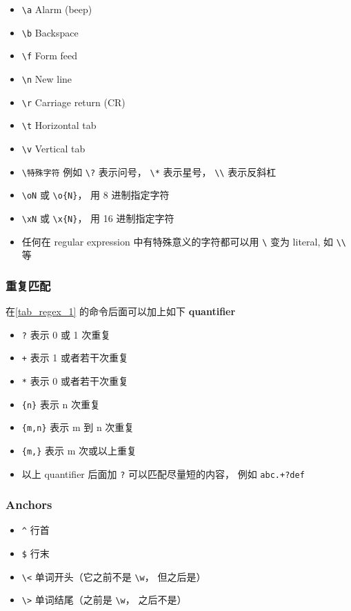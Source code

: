 \begin{itemize}
\item \verb`\a` Alarm (beep)
\item \verb`\b` Backspace
\item \verb`\f` Form feed
\item \verb`\n` New line
\item \verb`\r` Carriage return (CR)
\item \verb`\t` Horizontal tab
\item \verb`\v` Vertical tab
\item \verb`\特殊字符` 例如 \verb`\?` 表示问号， \verb`\*` 表示星号， \verb`\\` 表示反斜杠
\item \verb`\oN` 或 \verb`\o{N}`， 用 8 进制指定字符
\item \verb`\xN` 或 \verb`\x{N}`， 用 16 进制指定字符
\item 任何在 regular expression 中有特殊意义的字符都可以用 \verb`\` 变为 literal, 如 \verb`\\` 等
\end{itemize}

\subsubsection{重复匹配}
在\autoref{tab_regex_1} 的命令后面可以加上如下 \textbf{quantifier}
\begin{itemize}
\item \verb|?| 表示 0 或 1 次重复
\item \verb|+| 表示 1 或者若干次重复
\item \verb|*| 表示 0 或者若干次重复
\item \verb|{n}| 表示 n 次重复
\item \verb|{m,n}| 表示 m 到 n 次重复
\item \verb|{m,}| 表示 m 次或以上重复
\item 以上 quantifier 后面加 \verb|?| 可以匹配尽量短的内容， 例如 \verb|abc.+?def|
\end{itemize}

\subsubsection{Anchors}
\begin{itemize}
\item \verb`^` 行首
\item \verb`$` 行末
\item \verb`\<` 单词开头（它之前不是 \verb|\w|， 但之后是）
\item \verb`\>` 单词结尾（之前是 \verb|\w|， 之后不是）
\end{itemize}

